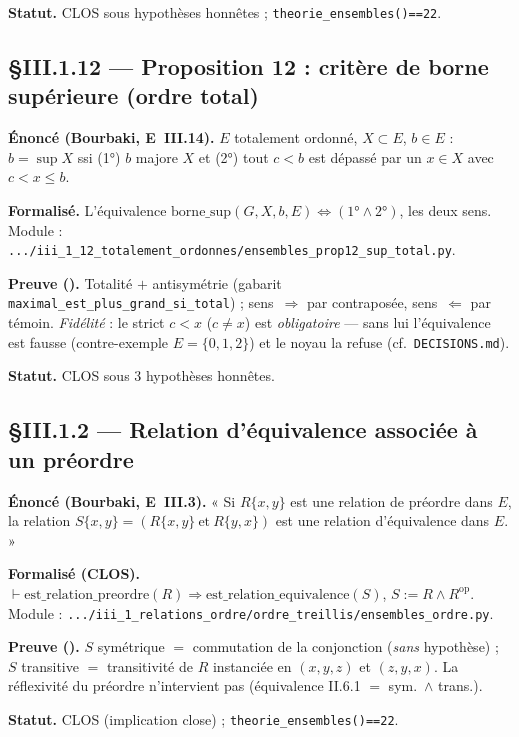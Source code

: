 \textbf{Statut.} CLOS sous hypothèses honnêtes ; \texttt{theorie\_ensembles()==22}.

\subsection{§III.1.12 --- Proposition 12 : critère de borne supérieure (ordre total)}
\textbf{Énoncé (Bourbaki, E~III.14).} $E$ totalement ordonné, $X\subset E$, $b\in E$ :
$b=\sup X$ ssi (1°) $b$ majore $X$ et (2°) tout $c<b$ est dépassé par un $x\in X$ avec $c<x\leq b$.

\textbf{Formalisé.} L'équivalence $\mathrm{borne\_sup}(G,X,b,E)\Leftrightarrow(\text{1°}\wedge\text{2°})$,
les deux sens. Module :
\texttt{.../iii\_1\_12\_totalement\_ordonnes/ensembles\_prop12\_sup\_total.py}.

\textbf{Preuve (\Nstar).} Totalité $+$ antisymétrie (gabarit
\texttt{maximal\_est\_plus\_grand\_si\_total}) ; sens~$\Rightarrow$ par contraposée,
sens~$\Leftarrow$ par témoin. \emph{Fidélité} : le strict $c<x$ ($c\neq x$) est
\emph{obligatoire} --- sans lui l'équivalence est fausse (contre-exemple
$E=\{0,1,2\}$) et le noyau la refuse (cf.\ \texttt{DECISIONS.md}).

\textbf{Statut.} CLOS sous $3$ hypothèses honnêtes.

\subsection{§III.1.2 --- Relation d'équivalence associée à un préordre}
\textbf{Énoncé (Bourbaki, E~III.3).} « Si $R\{x,y\}$ est une relation de préordre dans $E$,
la relation $S\{x,y\}=(R\{x,y\}\ \text{et}\ R\{y,x\})$ est une relation d'équivalence dans $E$. »

\textbf{Formalisé (CLOS).} $\vdash\mathrm{est\_relation\_preordre}(R)\Rightarrow
\mathrm{est\_relation\_equivalence}(S)$, $S:=R\wedge R^{\mathrm{op}}$. Module :
\texttt{.../iii\_1\_relations\_ordre/ordre\_treillis/ensembles\_ordre.py}.

\textbf{Preuve (\Nstar).} $S$ symétrique $=$ commutation de la conjonction (\emph{sans} hypothèse) ;
$S$ transitive $=$ transitivité de $R$ instanciée en $(x,y,z)$ et $(z,y,x)$. La réflexivité du
préordre n'intervient pas (équivalence II.6.1 $=$ sym.\ $\wedge$ trans.).

\textbf{Statut.} CLOS (implication close) ; \texttt{theorie\_ensembles()==22}.
